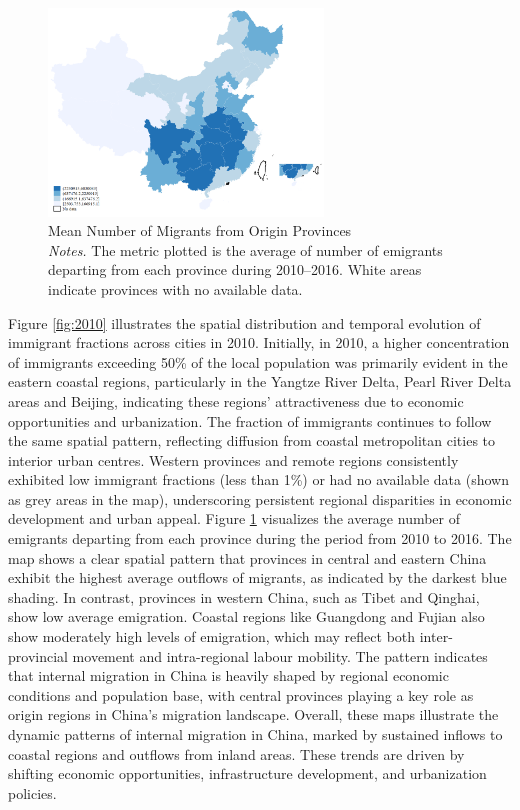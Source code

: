 \documentclass[12pt]{article}
\begin{document}
\begin{figure}[!htbp]
 \centering
 \includegraphics[width=0.65\textwidth]{../Analysis/output/migration_origin.png}
 \caption{Mean Number of Migrants from Origin Provinces \vspace{1ex} \\ 
   {\footnotesize \emph{Notes.} The metric plotted is the average of number of emigrants departing from each province during 2010--2016. White areas indicate provinces with no available data.}}
 \label{fig:origin}
\end{figure}

Figure \ref{fig:2010} illustrates the spatial distribution and temporal evolution of immigrant fractions across cities in 2010. Initially, in 2010, a higher concentration of immigrants exceeding 50\% of the local population was primarily evident in the eastern coastal regions, particularly in the Yangtze River Delta, Pearl River Delta areas and Beijing, indicating these regions' attractiveness due to economic opportunities and urbanization.
The fraction of immigrants continues to follow the same spatial pattern, reflecting diffusion from coastal metropolitan cities to interior urban centres.
Western provinces and remote regions consistently exhibited low immigrant fractions (less than 1\%) or had no available data (shown as grey areas in the map), underscoring persistent regional disparities in economic development and urban appeal.
Figure \ref{fig:origin} visualizes the average number of emigrants departing from each province during the period from 2010 to 2016. The map shows a clear spatial pattern that provinces in central and eastern China exhibit the highest average outflows of migrants, as indicated by the darkest blue shading. In contrast, provinces in western China, such as Tibet and Qinghai, show low average emigration. Coastal regions like Guangdong and Fujian also show moderately high levels of emigration, which may reflect both inter-provincial movement and intra-regional labour mobility. The pattern indicates that internal migration in China is heavily shaped by regional economic conditions and population base, with central provinces playing a key role as origin regions in China's migration landscape. 
Overall, these maps illustrate the dynamic patterns of internal migration in China, marked by sustained inflows to coastal regions and outflows from inland areas. These trends are driven by shifting economic opportunities, infrastructure development, and urbanization policies.
\end{document}
